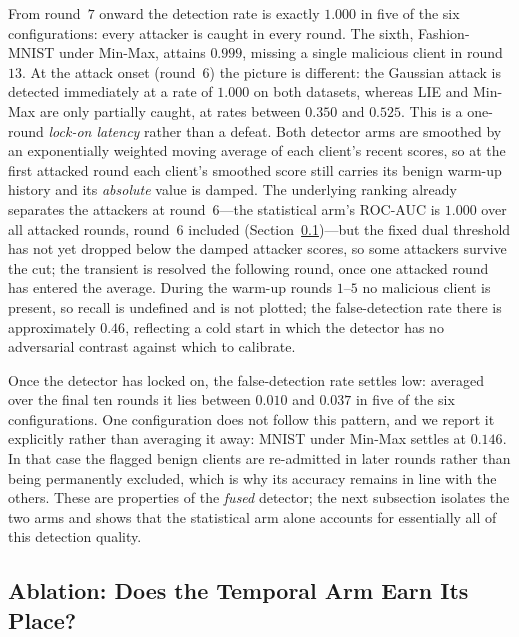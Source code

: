 \documentclass[journal]{IEEEtran}
\begin{document}
From round~$7$ onward the detection rate is exactly $1.000$ in five of the six configurations: every attacker is caught in every round. The sixth, Fashion-MNIST under Min-Max, attains $0.999$, missing a single malicious client in round~$13$. At the attack onset (round~$6$) the picture is different: the Gaussian attack is detected immediately at a rate of $1.000$ on both datasets, whereas LIE and Min-Max are only partially caught, at rates between $0.350$ and $0.525$. This is a one-round \emph{lock-on latency} rather than a defeat. Both detector arms are smoothed by an exponentially weighted moving average of each client's recent scores, so at the first attacked round each client's smoothed score still carries its benign warm-up history and its \emph{absolute} value is damped. The underlying ranking already separates the attackers at round~$6$---the statistical arm's ROC-AUC is $1.000$ over all attacked rounds, round~$6$ included (Section~\ref{sec:ablation})---but the fixed dual threshold has not yet dropped below the damped attacker scores, so some attackers survive the cut; the transient is resolved the following round, once one attacked round has entered the average. During the warm-up rounds $1$--$5$ no malicious client is present, so recall is undefined and is not plotted; the false-detection rate there is approximately $0.46$, reflecting a cold start in which the detector has no adversarial contrast against which to calibrate.

Once the detector has locked on, the false-detection rate settles low: averaged over the final ten rounds it lies between $0.010$ and $0.037$ in five of the six configurations. One configuration does not follow this pattern, and we report it explicitly rather than averaging it away: MNIST under Min-Max settles at $0.146$. In that case the flagged benign clients are re-admitted in later rounds rather than being permanently excluded, which is why its accuracy remains in line with the others. These are properties of the \emph{fused} detector; the next subsection isolates the two arms and shows that the statistical arm alone accounts for essentially all of this detection quality.

\subsection{Ablation: Does the Temporal Arm Earn Its Place?}
\label{sec:ablation}
\end{document}
